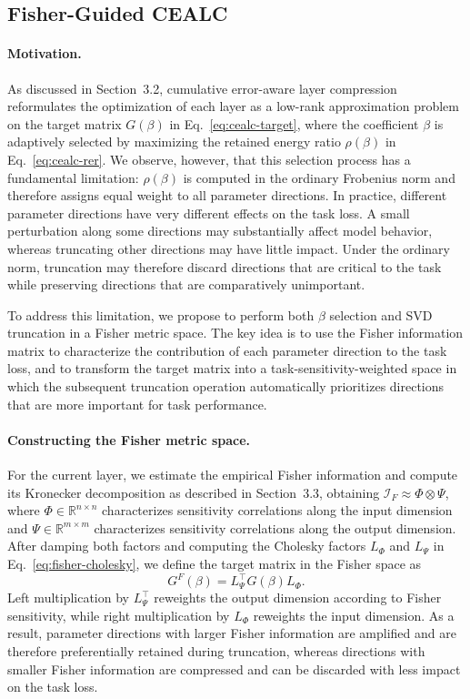 \documentclass[a4paper,fleqn]{cas-dc}
\begin{document}
\subsection{Fisher-Guided CEALC}

\paragraph{Motivation.}
As discussed in Section~3.2, cumulative error-aware layer compression reformulates the optimization of each layer as a low-rank approximation problem on the target matrix $G(\beta)$ in Eq.~\eqref{eq:cealc-target}, where the coefficient $\beta$ is adaptively selected by maximizing the retained energy ratio $\rho(\beta)$ in Eq.~\eqref{eq:cealc-rer}. We observe, however, that this selection process has a fundamental limitation: $\rho(\beta)$ is computed in the ordinary Frobenius norm and therefore assigns equal weight to all parameter directions. In practice, different parameter directions have very different effects on the task loss. A small perturbation along some directions may substantially affect model behavior, whereas truncating other directions may have little impact. Under the ordinary norm, truncation may therefore discard directions that are critical to the task while preserving directions that are comparatively unimportant.

To address this limitation, we propose to perform both $\beta$ selection and SVD truncation in a Fisher metric space. The key idea is to use the Fisher information matrix to characterize the contribution of each parameter direction to the task loss, and to transform the target matrix into a task-sensitivity-weighted space in which the subsequent truncation operation automatically prioritizes directions that are more important for task performance.

\paragraph{Constructing the Fisher metric space.}
For the current layer, we estimate the empirical Fisher information and compute its Kronecker decomposition as described in Section~3.3, obtaining $\mathcal{I}_F \approx \Phi \otimes \Psi$, where $\Phi \in \mathbb{R}^{n \times n}$ characterizes sensitivity correlations along the input dimension and $\Psi \in \mathbb{R}^{m \times m}$ characterizes sensitivity correlations along the output dimension. After damping both factors and computing the Cholesky factors $L_\Phi$ and $L_\Psi$ in Eq.~\eqref{eq:fisher-cholesky}, we define the target matrix in the Fisher space as
\begin{equation}
G^F(\beta) = L_\Psi^\top G(\beta) L_\Phi.
\label{eq:fisher-target}
\end{equation}
Left multiplication by $L_\Psi^\top$ reweights the output dimension according to Fisher sensitivity, while right multiplication by $L_\Phi$ reweights the input dimension. As a result, parameter directions with larger Fisher information are amplified and are therefore preferentially retained during truncation, whereas directions with smaller Fisher information are compressed and can be discarded with less impact on the task loss.
\end{document}
